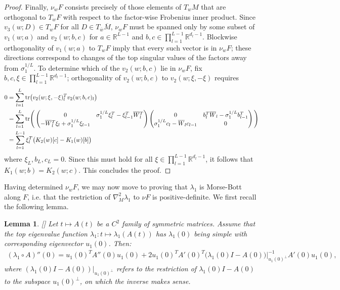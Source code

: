 \documentclass{article}
\newcommand{\RB}{\mathbb{R}}
\newcommand{\bw}{\overline{w}}
\newcommand{\bW}{\smash{\overline{W}}\vphantom{W}}
\newcommand{\bM}{\overline{M}}
\newcommand{\tr}{\mathrm{tr}}
\theoremstyle{plain}
\newtheorem{lemma}[theorem]{Lemma}
\theoremstyle{definition}
\theoremstyle{remark}
\begin{document}
\begin{proof}
    Finally, $\nu_wF$ consists precisely of those elements of $T_wM$ that are orthogonal to $T_wF$ with respect to the factor-wise Frobenius inner product. Since $v_3(w;D)\in T_wF$ for all $D\in T_{\bw}\bM$, $\nu_wF$ must be spanned only by some subset of $v_1(w;a)$ and $v_2(w;b,c)$ for $a\in\RB^{L-1}$ and $b,c\in\prod_{l=1}^{L-1}\RB^{d_l-1}$. Blockwise orthogonality of $v_1(w;a)$ to $T_wF$ imply that every such vector is in $\nu_wF$; these directions correspond to changes of the top singular values of the factors away from $\sigma_1^{1/L}$. To determine which of the $v_2(w;b,c)$ lie in $\nu_wF$, fix $b,c,\xi\in\prod_{l=1}^{L-1}\RB^{d_l-1}$; orthogonality of $v_2(w;b,c)$ to $v_2(w;\xi,-\xi)$ requires
    \begin{align}
        0 &= \sum_{l=1}^{L}\tr\big(v_2(w;\xi,-\xi)^T_lv_2(w;b,c)_l\big)\\&=\sum_{l=1}^{L}\tr\Bigg(\begin{pmatrix}0 & \sigma_1^{1/L}\xi_l^T - \xi_{l-1}^T\bW_l^T \\ -\bW_l^T\xi_l + \sigma_1^{1/L}\xi_{l-1}\end{pmatrix}\begin{pmatrix} 0 & b_l^T\bW_l - \sigma_1^{1/L}b_{l-1}^T \\ \sigma_1^{1/L}c_l-\bW_lc_{l-1} & 0\end{pmatrix}\Bigg)\\&=\sum_{l=1}^{L-1}\xi_l^T\big(K_2(w)[c] - K_1(w)[b]\big)
    \end{align}
    where $\xi_L,b_L,c_L = 0$. Since this must hold for all $\xi\in\prod_{l=1}^{L-1}\RB^{d_l-1}$, it follows that $K_1(w;b) = K_2(w;c)$. This concludes the proof.
\end{proof}

Having determined $\nu_wF$, we may now move to proving that $\lambda_1$ is Morse-Bott along $F$, i.e. that the restriction of $\nabla^2_M\lambda_1$ to $\nu F$ is positive-definite. We first recall the following lemma.

\begin{lemma}\label{lem:secondorderperturbation}[\cite[3.2.2]{eigenvalue_perturbation}]
    Let $t\mapsto A(t)$ be a $C^2$ family of symmetric matrices. Assume that the top eigenvalue function $\lambda_1:t\mapsto \lambda_1(A(t))$ has $\lambda_1(0)$ being simple with corresponding eigenvector $u_1(0)$. Then:
    \begin{align}
    (\lambda_1\circ A)''(0) = u_1(0)^TA''(0)u_1(0) + 2u_1(0)^TA'(0)^T\big(\lambda_1(0)I-A(0)\big)|_{u_1(0)^{\perp}}^{-1}A'(0)u_1(0),
    \end{align}
    where $(\lambda_1(0)I-A(0))|_{u_1(0)^{\perp}}$ refers to the restriction of $\lambda_1(0)I-A(0)$ to the subspace $u_1(0)^{\perp}$, on which the inverse makes sense.
\end{lemma}
\end{document}
